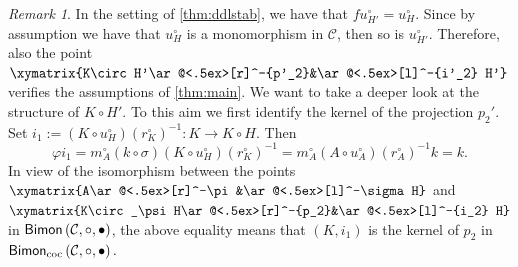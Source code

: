 \documentclass[nosumlimits,twoside]{amsart}
\theoremstyle{definition}
\theoremstyle{remark}
\newtheorem{remark}[remark]{\sc Remark}
\newcommand{\rd}[1]{{\color{red}{#1}}}
\newcommand{\Cc}{\mathcal{C}}
\def\Bimon{{\sf Bimon}}
\def\cBimon{{\sf Bimon}_{\mathrm{coc}}}
\begin{document}
\begin{remark}%
\label{rmk:pulbantip}
 In the setting of \cref{thm:ddlstab}, we have that $fu_{H'}^\circ=u_{H}^\circ$. Since by assumption we have that $u_{H}^\circ$ is a monomorphism in $\Cc$, then so is $u_{H'}^\circ$. Therefore, also the point $\xymatrix{K\circ H'\ar@<.5ex>[r]^-{p'_2}&\ar@<.5ex>[l]^-{i'_2} H'}$ verifies the assumptions of \cref{thm:main}. We want to take a deeper look at the structure of $K\circ H'$. To this aim we first identify the kernel of the projection $p_2'$.
 Set $i_{1}:=\left( K\circ u_{H}^{\circ }\right) \left( r_{K}^{\circ }\right)
^{-1}:K\rightarrow K\circ H.$ Then
\begin{equation*}
\varphi i_{1}=m_{A}^{\circ }\left( k\circ \sigma \right) \left( K\circ
u_{H}^{\circ }\right) \left( r_{K}^{\circ }\right) ^{-1}=m_{A}^{\circ
}\left( A\circ u_{A}^{\circ }\right) \left( r_{A}^{\circ }\right) ^{-1}k=k.
\end{equation*}%
In view of the isomorphism between the points $\xymatrix{A\ar@<.5ex>[r]^-\pi&\ar@<.5ex>[l]^-\sigma H}$ and $\xymatrix{K\circ_\psi H\ar@<.5ex>[r]^-{p_2}&\ar@<.5ex>[l]^-{i_2} H}$ in $\Bimon \left(\Cc,\circ,\bullet\right) $, the above equality means that $\left( K,i_{1}\right) $ is the kernel of $p_{2}$ in $\cBimon\left(
\mathcal{C},\circ ,\bullet \right) .$ 


\end{remark}
\end{document}
